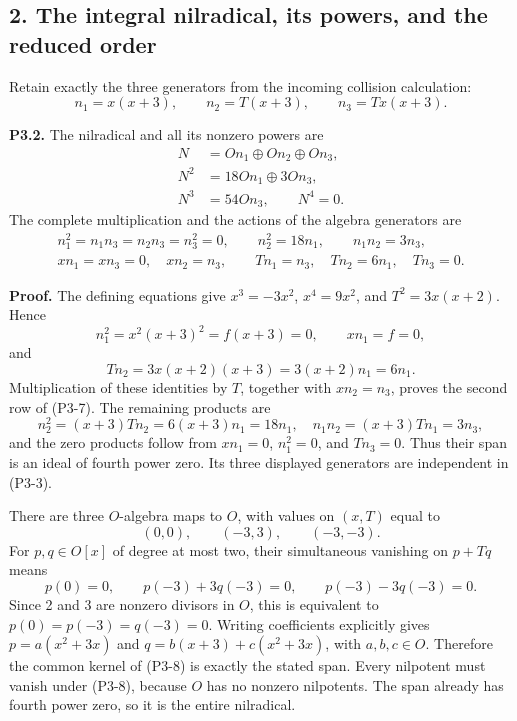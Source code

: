 \documentclass[
  10pt,
]{article}
\begin{document}
\subsection{2. The integral nilradical, its powers, and the reduced
order}\label{the-integral-nilradical-its-powers-and-the-reduced-order}

Retain exactly the three generators from the incoming collision
calculation: \[
n_1=x(x+3),\qquad n_2=T(x+3),\qquad n_3=Tx(x+3).
\tag{P3-5}
\]

\textbf{P3.2.} The nilradical and all its nonzero powers are \[
\begin{aligned}
N&=On_1\oplus On_2\oplus On_3,\\
N^2&=18On_1\oplus3On_3,\\
N^3&=54On_3,\qquad N^4=0.
\end{aligned}
\tag{P3-6}
\] The complete multiplication and the actions of the algebra generators
are \[
\begin{gathered}
n_1^2=n_1n_3=n_2n_3=n_3^2=0,\qquad
n_2^2=18n_1,\qquad n_1n_2=3n_3,\\
xn_1=xn_3=0,\quad xn_2=n_3,\qquad
Tn_1=n_3,\quad Tn_2=6n_1,\quad Tn_3=0.
\end{gathered}
\tag{P3-7}
\]

\textbf{Proof.} The defining equations give \(x^3=-3x^2\), \(x^4=9x^2\),
and \(T^2=3x(x+2)\). Hence \[
n_1^2=x^2(x+3)^2=f(x+3)=0,\qquad
xn_1=f=0,
\] and \[
Tn_2=3x(x+2)(x+3)=3(x+2)n_1=6n_1.
\] Multiplication of these identities by \(T\), together with
\(xn_2=n_3\), proves the second row of (P3-7). The remaining products
are \[
n_2^2=(x+3)Tn_2=6(x+3)n_1=18n_1,
\quad n_1n_2=(x+3)Tn_1=3n_3,
\] and the zero products follow from \(xn_1=0\), \(n_1^2=0\), and
\(Tn_3=0\). Thus their span is an ideal of fourth power zero. Its three
displayed generators are independent in (P3-3).

There are three \(O\)-algebra maps to \(O\), with values on \((x,T)\)
equal to \[
(0,0),\qquad(-3,3),\qquad(-3,-3).
\tag{P3-8}
\] For \(p,q\in O[x]\) of degree at most two, their simultaneous
vanishing on \(p+Tq\) means \[
p(0)=0,\qquad p(-3)+3q(-3)=0,\qquad
p(-3)-3q(-3)=0.
\] Since 2 and 3 are nonzero divisors in \(O\), this is equivalent to
\(p(0)=p(-3)=q(-3)=0\). Writing coefficients explicitly gives
\(p=a(x^2+3x)\) and \(q=b(x+3)+c(x^2+3x)\), with \(a,b,c\in O\).
Therefore the common kernel of (P3-8) is exactly the stated span. Every
nilpotent must vanish under (P3-8), because \(O\) has no nonzero
nilpotents. The span already has fourth power zero, so it is the entire
nilradical.
\end{document}
